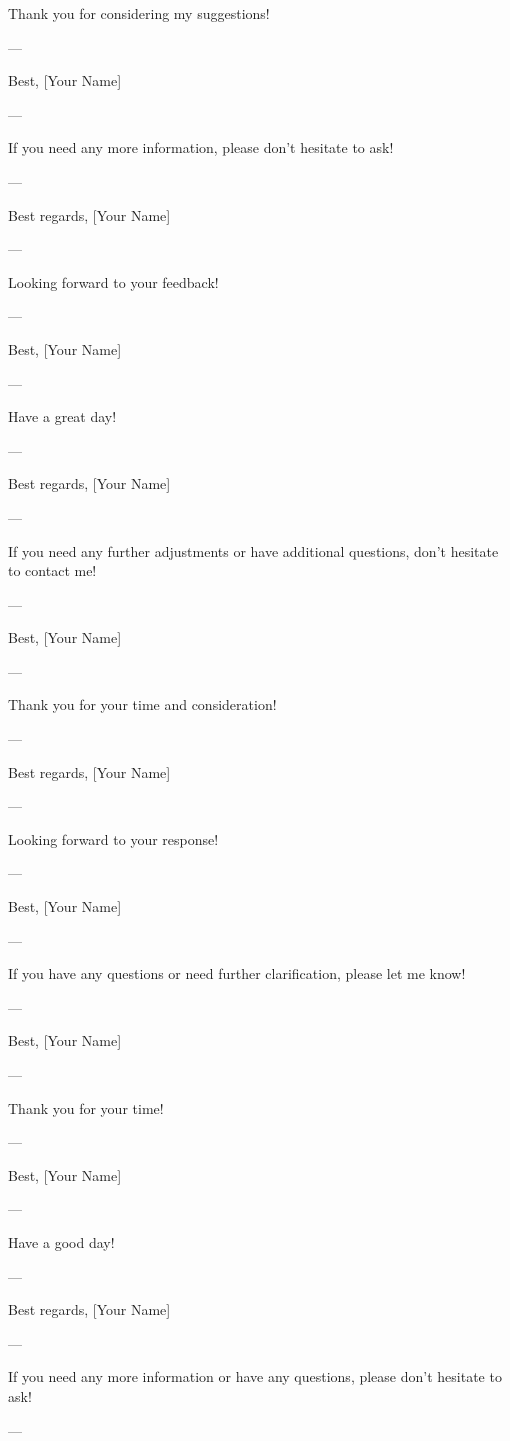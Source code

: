 Thank you for considering my suggestions! 

--- 

Best,  
[Your Name]  

--- 

If you need any more information, please don't hesitate to ask! 

--- 

Best regards,  
[Your Name]  

--- 

Looking forward to your feedback! 

--- 

Best,  
[Your Name]  

--- 

Have a great day! 

--- 

Best regards,  
[Your Name]  

--- 

If you need any further adjustments or have additional questions, don't hesitate to contact me! 

--- 

Best,  
[Your Name]  

--- 

Thank you for your time and consideration! 

--- 

Best regards,  
[Your Name]  

--- 

Looking forward to your response! 

--- 

Best,  
[Your Name]  

--- 

If you have any questions or need further clarification, please let me know! 

--- 

Best,  
[Your Name]  

--- 

Thank you for your time! 

--- 

Best,  
[Your Name]  

--- 

Have a good day! 

--- 

Best regards,  
[Your Name]  

--- 

If you need any more information or have any questions, please don't hesitate to ask! 

--- 

